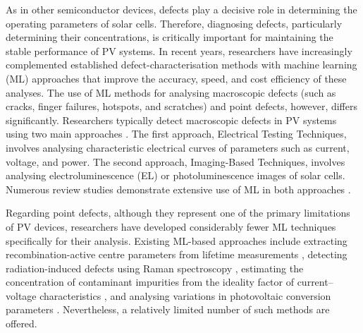 \documentclass[10pt]{iopart}
\begin{document}
As in other semiconductor devices, defects play a decisive role in determining the operating parameters of solar cells.
Therefore, diagnosing defects, particularly determining their concentrations, is critically important for maintaining the stable performance of PV systems.
In recent years, researchers have increasingly complemented established defect-characterisation methods with machine learning (ML) approaches that improve the accuracy, speed, and cost efficiency of these analyses.
The use of ML methods for analysing macroscopic defects (such as cracks, finger failures, hotspots, and scratches) and point defects, however, differs significantly.
Researchers typically detect macroscopic defects in PV systems using two main approaches \cite{Jia2024, Hijjawi2023}.
The first approach, Electrical Testing Techniques, involves analysing characteristic electrical curves of parameters such as current, voltage, and power.
The second approach, Imaging-Based Techniques, involves analysing electroluminescence (EL) \cite{Liu2024a} or photoluminescence \cite{Doll2021} images of solar cells.
Numerous review studies demonstrate extensive use of ML in both approaches \cite{Datta2023, Jaiswal2023, Buratti2024, MAHDAVIPOUR, Hopwood2020, Li2021, Liu2021}.

Regarding point defects, although they represent one of the primary limitations of PV devices, researchers have developed considerably fewer ML techniques specifically for their analysis.
Existing ML-based approaches include extracting recombination-active centre parameters from lifetime measurements \cite{Wang2024a, Buratti2022, Buratti2020a},
detecting radiation-induced defects using Raman spectroscopy \cite{Park2022, Chia2024},
estimating the concentration of contaminant impurities from the ideality factor of current–voltage characteristics \cite{Olikh2022PPV},
and analysing variations in photovoltaic conversion parameters \cite{Olikh2025SE}.
Nevertheless, a relatively limited number of such methods are offered.
\end{document}
